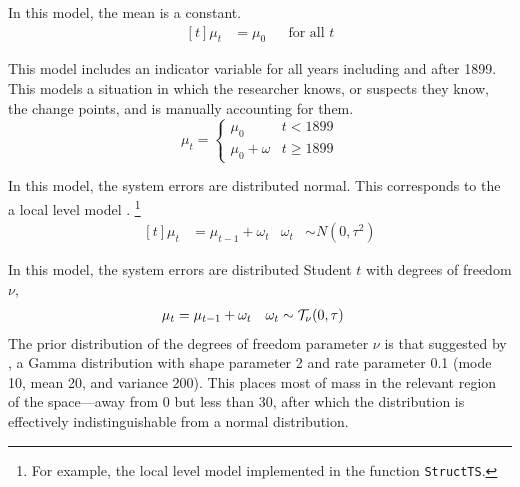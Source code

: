 \begin{description}[font = \normalfont\ModelII]
\item[Constant] In this model, the mean is a constant.
  \begin{equation}
    \label{dlm:eq:21}
    \begin{aligned}[t]
      \mu_{t} &= \mu_{0} && \text{for all $t$}
    \end{aligned}
  \end{equation}
\item[Intervention] This model includes an indicator variable for all years including and after 1899.
  This models a situation in which the researcher knows, or suspects they know, the change points, and is manually accounting for them.
  \begin{equation}
    \mu_{t} = 
    \begin{cases}
      \mu_{0} & t < 1899 \\
      \mu_{0} + \omega & t \geq 1899
    \end{cases}
  \end{equation}
\item[Normal] In this model, the system errors are distributed normal.
  This corresponds to the a local level model \parencites[Ch. 2]{DurbinKoopman2012}[Ch. 2]{WestHarrison1997}.%
  \footnote{For example, the local level model implemented in the \RLang{} function \texttt{StructTS}.}
  \begin{equation}
    \label{dlm:eq:11}
    \begin{aligned}[t]
      \mu_{t} &= \mu_{t - 1} + \omega_{t} & \omega_{t} & \sim N(0, \tau^{2})
    \end{aligned}
  \end{equation}
\item[StudentT] In this model, the system errors are distributed Student $t$ with degrees of freedom $\nu$,
  \begin{equation}
    \label{dlm:eq:18}
    \begin{aligned}[t]
      \mu_{t} &= \mu_{t - 1} + \omega_{t} & \omega_{t} & \sim \mathcal{T}_{\nu}\mathopen{}\left(0, \tau\right)\mathclose{}
    \end{aligned}
  \end{equation}
  The prior distribution of the degrees of freedom parameter $\nu$ is that suggested by \textcites{JuarezSteel2010b}, a Gamma distribution with shape parameter 2 and rate parameter 0.1 (mode 10, mean 20, and variance 200).
  This places most of mass in the relevant region of the space---away from 0 but less than 30, after which the distribution is effectively indistinguishable from a normal distribution.

\end{description}
